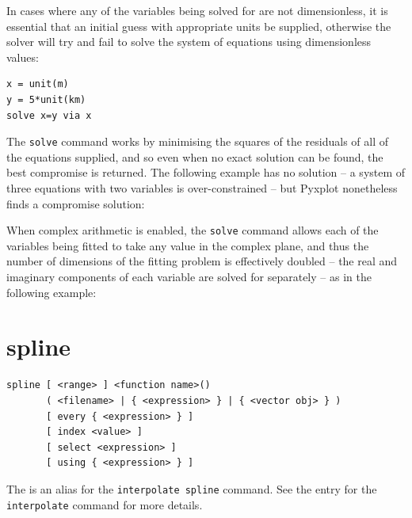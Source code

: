 \vspace{3mm}

\vspace{3mm}

\noindent In cases where any of the variables being solved for are not
dimensionless, it is essential that an initial guess with appropriate units be
supplied, otherwise the solver will try and fail to solve the system of
equations using dimensionless values:

\begin{verbatim}
x = unit(m)
y = 5*unit(km)
solve x=y via x
\end{verbatim}

The {\tt solve} command works by minimising the squares of the residuals of all
of the equations supplied, and so even when no exact solution can be found, the
best compromise is returned. The following example has no solution -- a system
of three equations with two variables is over-constrained -- but Pyxplot
nonetheless finds a compromise solution:

\vspace{3mm}

\vspace{3mm}

When complex arithmetic is enabled, the {\tt solve} command allows each of the
variables being fitted to take any value in the complex plane, and thus the
number of dimensions of the fitting problem is effectively doubled -- the real
and imaginary components of each variable are solved for separately -- as in
the following example:

\vspace{3mm}

\vspace{3mm}


\section{spline}

\begin{verbatim}
spline [ <range> ] <function name>()
       ( <filename> | { <expression> } | { <vector obj> } )
       [ every { <expression> } ]
       [ index <value> ]
       [ select <expression> ]
       [ using { <expression> } ]
\end{verbatim}

The  is an alias for the {\tt interpolate spline} command.
See the entry for the {\tt interpolate} command for more details.


